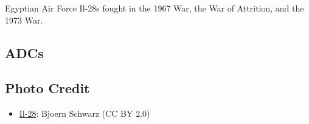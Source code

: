 Egyptian Air Force Il-28s fought in the 1967 War, the War of Attrition, and the 1973 War.

\subsection{ADCs}
\begin{adclist}
\end{adclist}

\subsection{Photo Credit}
\begin{itemize}\raggedright
    \item \href{https://commons.wikimedia.org/wiki/File:%22Frontbomber%22_Iljuschin_Il-28_%22Beagle%22.jpg}{Il-28}: Bjoern Schwarz (CC BY 2.0)
    \end{itemize}
